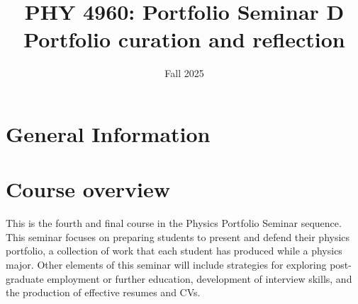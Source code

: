 \documentclass{syllabus}
\begin{document}
\thispagestyle{fancy}
\date{Fall 2025}
\author{}
\title{PHY 4960: Portfolio Seminar D \\ {\large \mdseries Portfolio curation and reflection}}
\maketitle



\section*{General Information}


\section*{Course overview}

This is the fourth and final course in the Physics Portfolio Seminar sequence. This seminar focuses on 
preparing students to present and defend their physics portfolio, a collection of work that each student has 
produced while a physics major. Other elements of this seminar will include strategies for exploring post-graduate employment or further education, development of interview skills, and the production of 
effective resumes and CVs.
\end{document}
